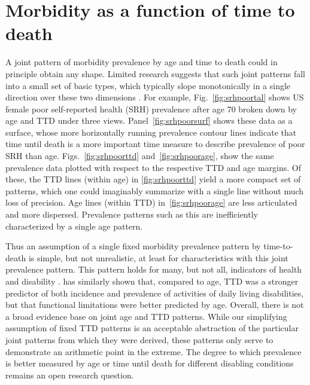 \documentclass[12pt,oneside,letterpaper,doublespacing]{article}  %
\begin{document}
\section{Morbidity as a function of time to death}
 \label{sec:morb}
 
A joint pattern of morbidity prevalence by age and time to death could in
principle obtain any shape. Limited research suggests that such joint patterns fall into a small set of basic types, which typically slope monotonically in a single direction over these two dimensions \citep{riffe2017ttd}. For example, Fig.~\ref{fig:srhpoortal} shows US female poor self-reported health (SRH) prevalence after age 70 broken down by age and TTD under three views. Panel~\ref{fig:srhpoorsurf} shows these data as a surface, whose more horizontally running prevalence contour lines indicate that time until death is a more important time measure to describe prevalence of poor SRH than age. Figs.~\ref{fig:srhpoorttd} and~\ref{fig:srhpoorage}, show the same prevalence data plotted with respect to the respective TTD and age margins. Of these, the TTD lines (within age) in \ref{fig:srhpoorttd} yield a more compact set of patterns, which one could imaginably summarize with a single line without much loss of precision. Age lines (within TTD) in~\ref{fig:srhpoorage} are less articulated and more dispersed. Prevalence patterns such as this are inefficiently characterized by a single age pattern.  

Thus an assumption of a single fixed morbidity prevalence pattern by
time-to-death is simple, but not unrealistic, at least for characteristics with this joint
prevalence pattern. This pattern holds for many, but not all, indicators of
health and disability \citep{riffe2017ttd}. \citet{klijs2010disability} has
similarly shown that, compared to age, TTD was a stronger predictor of both
incidence and prevalence of activities of daily living disabilities, but that
functional limitations were better predicted by age.
Overall, there is not a broad evidence base on joint age and TTD patterns. While our simplifying assumption of fixed TTD patterns is an acceptable abstraction of the particular joint patterns from which they were derived, these patterns only serve to demonstrate an arithmetic point in the extreme. The degree to which prevalence is better measured by age or time until death for different disabling conditions remains an open research question.
\end{document}
